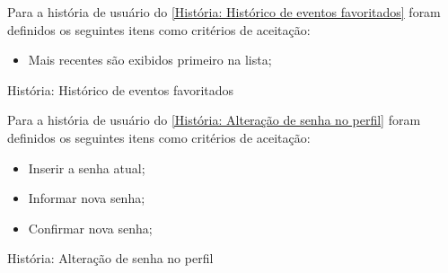 Para a história de usuário do \autoref{História: Histórico de eventos favoritados} foram definidos os seguintes itens como critérios de aceitação:

\begin{itemize}
\item Mais recentes são exibidos primeiro na lista;
\end{itemize}

\def\arraystretch{2}
\begin{quadro}[htb]
\centering
\ABNTEXfontereduzida
\caption[História: Histórico de eventos favoritados]{História: Histórico de eventos favoritados}
\label{História: Histórico de eventos favoritados}
\end{quadro}
\FloatBarrier 

Para a história de usuário do \autoref{História: Alteração de senha no perfil} foram definidos os seguintes itens como critérios de aceitação:

\begin{itemize}
\item Inserir a senha atual;
\item Informar nova senha;
\item Confirmar nova senha;
\end{itemize}

\def\arraystretch{2}
\begin{quadro}[htb]
\centering
\ABNTEXfontereduzida
\caption[História: Alteração de senha no perfil]{História: Alteração de senha no perfil}
\label{História: Alteração de senha no perfil}
\end{quadro}
\FloatBarrier 
